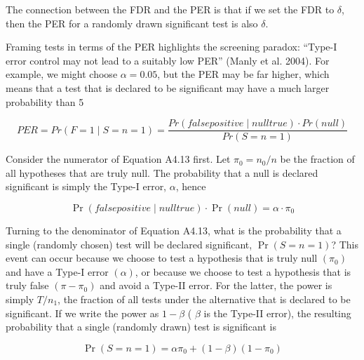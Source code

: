 \documentclass{article}
\begin{document}
The connection between the FDR and the PER is that if we set the FDR to  $ \delta $, then the PER for a randomly drawn significant test is also  $ \delta $.

Framing tests in terms of the PER highlights the screening paradox: “Type-I error control may not lead to a suitably low PER” (Manly et al. 2004). For example, we might choose  $ \alpha = 0.05 $, but the PER may be far higher, which means that a test that is declared to be significant may have a much larger probability than 5%

\begin{equation}
PER=Pr(F=1\mid S=n=1)=\frac{Pr(false positive\mid null true)\cdot Pr(null)}{Pr(S=n=1)}
\end{equation}

Consider the numerator of Equation A4.13 first. Let  $ \pi_0 = n_0/n $ be the fraction of all hypotheses that are truly null. The probability that a null is declared significant is simply the Type-I error,  $ \alpha $, hence

\begin{equation}
\Pr(false positive\mid null true)\cdot\Pr(null)=\alpha\cdot\pi_{0}
\end{equation}

Turning to the denominator of Equation A4.13, what is the probability that a single (randomly chosen) test will be declared significant,  $ \Pr(S = n = 1) $? This event can occur because we choose to test a hypothesis that is truly null  $ (\pi_0) $ and have a Type-I error  $ (\alpha) $, or because we choose to test a hypothesis that is truly false  $ (\pi - \pi_0) $ and avoid a Type-II error. For the latter, the power is simply  $ T/n_1 $, the fraction of all tests under the alternative that is declared to be significant. If we write the power as  $ 1 - \beta $ ( $ \beta $ is the Type-II error), the resulting probability that a single (randomly drawn) test is significant is

\begin{equation}
\Pr(S=n=1)=\alpha\pi_{0}+(1-\beta)(1-\pi_{0})
\end{equation}
\end{document}
